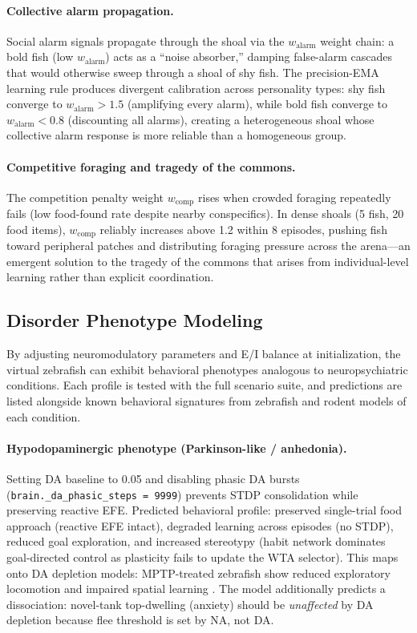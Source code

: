 \documentclass[12pt]{article}
\begin{document}
\paragraph{Collective alarm propagation.}
Social alarm signals propagate through the shoal via the $w_\text{alarm}$
weight chain: a bold fish (low $w_\text{alarm}$) acts as a ``noise
absorber,'' damping false-alarm cascades that would otherwise sweep through
a shoal of shy fish.
The precision-EMA learning rule produces divergent calibration across
personality types: shy fish converge to $w_\text{alarm} > 1.5$ (amplifying
every alarm), while bold fish converge to $w_\text{alarm} < 0.8$
(discounting all alarms), creating a heterogeneous shoal whose collective
alarm response is more reliable than a homogeneous group.

\paragraph{Competitive foraging and tragedy of the commons.}
The competition penalty weight $w_{\text{comp}}$ rises when crowded
foraging repeatedly fails (low food-found rate despite nearby conspecifics).
In dense shoals (5 fish, 20 food items), $w_{\text{comp}}$ reliably
increases above 1.2 within 8 episodes, pushing fish toward peripheral
patches and distributing foraging pressure across the arena---an emergent
solution to the tragedy of the commons that arises from individual-level
learning rather than explicit coordination.

\subsection{Disorder Phenotype Modeling}

By adjusting neuromodulatory parameters and E/I balance at initialization,
the virtual zebrafish can exhibit behavioral phenotypes analogous to
neuropsychiatric conditions.
Each profile is tested with the full scenario suite, and predictions are
listed alongside known behavioral signatures from zebrafish and rodent
models of each condition.

\paragraph{Hypodopaminergic phenotype (Parkinson-like / anhedonia).}
Setting DA baseline to 0.05 and disabling phasic DA bursts
(\texttt{brain.\_da\_phasic\_steps = 9999}) prevents STDP consolidation
while preserving reactive EFE.
Predicted behavioral profile: preserved single-trial food approach (reactive
EFE intact), degraded learning across episodes (no STDP), reduced goal
exploration, and increased stereotypy (habit network dominates
goal-directed control as plasticity fails to update the WTA selector).
This maps onto DA depletion models: MPTP-treated zebrafish show reduced
exploratory locomotion and impaired spatial learning \citep{sallinen2009}.
The model additionally predicts a dissociation: novel-tank top-dwelling
(anxiety) should be \emph{unaffected} by DA depletion because flee
threshold is set by NA, not DA.
\end{document}
